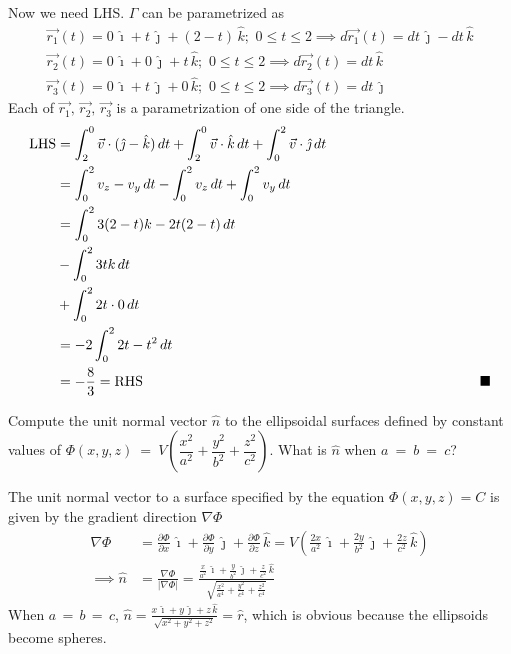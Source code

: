 \documentclass[../main.tex]{subfiles}
\begin{document}
\begin{questions}
\begin{solution}
	Now we need LHS. $\Gamma$ can be parametrized as
	\begin{gather}
		\vec{r_1}(t) = 0\,\hat{\imath} + t\,\hat{\jmath} + (2-t)\,\hat{k};\,\, 0 \leq t \leq 2 \implies d\vec{r_1}(t) = dt\,\hat{\jmath}-dt\,\hat{k} \\
		\vec{r_2}(t) = 0\,\hat{\imath} + 0\,\hat{\jmath} + t\,\hat{k};\,\, 0 \leq t \leq 2 \implies d\vec{r_2}(t) = dt\,\hat{k}\\
		\vec{r_3}(t) = 0\,\hat{\imath} + t\,\hat{\jmath} + 0\,\hat{k};\,\, 0 \leq t \leq 2 \implies d\vec{r_3}(t) = dt\,\hat{\jmath}
	\end{gather}
	Each of $\vec{r_1},\,\vec{r_2},\,\vec{r_3}$ is a parametrization of one side of the triangle.
	\begin{align}
		\text{LHS}&=\int^{0}_2\vec{v}\cdot(\hat{\jmath}-\hat{k})\,dt+\int^{0}_2\vec{v}\cdot\hat{k}\,dt+\int^{2}_0\vec{v}\cdot\hat{\jmath}\,dt \\
		&=\int^2_0v_z-v_y\,dt-\int^2_0v_z\,dt+\int^2_0v_y\,dt \\
		&=\int^2_03(2-t)k-2t(2-t)\,dt \\
		&-\int^2_03tk\,dt\\
		&+\int^2_02t\cdot0\,dt \\
		&=-2\int^2_02t-t^2\,dt \\
		&=-\frac{8}{3} = \text{RHS} \hskip0.7\textwidth\blacksquare
	\end{align}
\end{solution}

\question Compute the unit normal vector $\hat{n}$ to the ellipsoidal surfaces defined by constant values of $\Phi(x,y,z) ~=~ V\left(\dfrac{x^2}{a^2} + \dfrac{y^2}{b^2} + \dfrac{z^2}{c^2}\right)$. What is $\hat{n}$ when $a~=~b~=~c$?
\begin{solution}
	The unit normal vector to a surface specified by the equation $\Phi(x,y,z) = C$ is given by the gradient direction $\nabla \Phi$
	\begin{align}
		\nabla \Phi &= \frac{\partial \Phi}{\partial x}\,\hat{\imath} + \frac{\partial \Phi}{\partial y}\,\hat{\jmath} + \frac{\partial \Phi}{\partial z}\,\hat{k} = V\left( \frac{2x}{a^2}\,\hat{\imath} + \frac{2y}{b^2}\,\hat{\jmath} + \frac{2z}{c^2}\,\hat{k}\right) \\
		\implies \hat{n} &= \frac{\nabla \Phi}{|\nabla \Phi|} = \frac{\frac{x}{a^2}\,\hat{\imath} + \frac{y}{b^2}\,\hat{\jmath}+ \frac{z}{c^2}\,\hat{k}}{\sqrt{\frac{x^2}{a^4} + \frac{y^2}{c^4} + \frac{z^2}{c^4}}}
	\end{align}
	When $a\,=\,b\,=\,c$, $\hat{n} = \frac{x\,\hat{\imath} + y\,\hat{\jmath} + z\,\hat{k}}{\sqrt{x^2 + y^2 + z^2}} = \hat{r}$, which is obvious because the ellipsoids become spheres.
\end{solution}


\end{questions}
\end{document}
